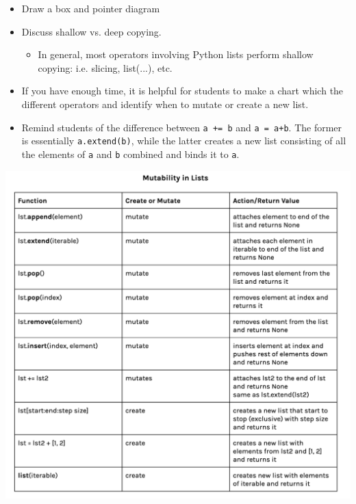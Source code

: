 \begin{blocksection}
	\begin{guide}
	\begin{itemize}
		\item Draw a box and pointer diagram
		\item Discuss shallow vs. deep copying. 
		\begin{itemize}
			\item In general, most operators involving Python lists perform shallow copying: i.e. slicing, list(...), etc.
		\end{itemize}
		\item If you have enough time, it is helpful for students to make a chart which the different operators and identify when to mutate or create a new list.
		\item Remind students of the difference between \lstinline{a += b} and \lstinline{a = a+b}. The former is essentially \lstinline{a.extend(b)}, while the latter creates a new list consisting of all the elements of \lstinline{a} and \lstinline{b} combined and binds it to \lstinline{a}.
	\end{itemize}
	\includegraphics[width=.9\textwidth]{list-mutation.png}
	\end{guide}
\end{blocksection}
	